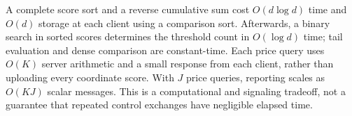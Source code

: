 A complete score sort and a reverse cumulative sum cost $O(d\log d)$ time and $O(d)$ storage at each client using a comparison sort. Afterwards, a binary search in sorted scores determines the threshold count in $O(\log d)$ time; tail evaluation and dense comparison are constant-time. Each price query uses $O(K)$ server arithmetic and a small response from each client, rather than uploading every coordinate score. With $J$ price queries, reporting scales as $O(KJ)$ scalar messages. This is a computational and signaling tradeoff, not a guarantee that repeated control exchanges have negligible elapsed time.
